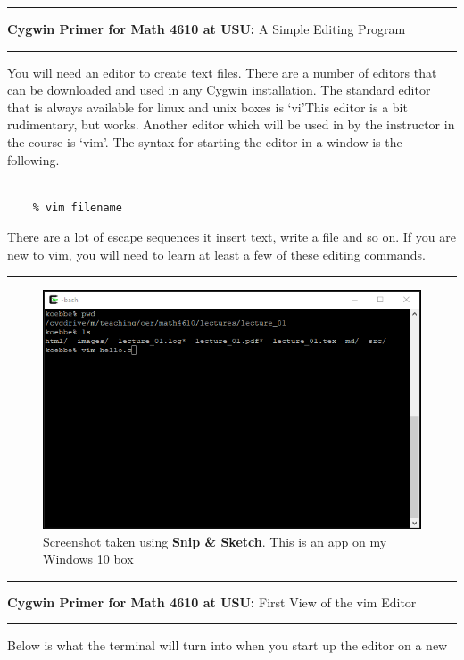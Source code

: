 \documentclass[10pt,fleqn]{article}
\begin{document}
\eject
\vskip0.1in\hrule\vskip0.1in
\noindent
{{\bf Cygwin Primer for Math 4610 at USU:} A Simple Editing Program} 
\vskip0.1in\hrule\vskip0.1in
\noindent
You will need an editor to create text files. There are a number of editors that
can be downloaded and used in any Cygwin installation. The standard editor that
is always available for linux and unix boxes is \lq vi\rq\. This editor is a bit
rudimentary, but works. Another editor which will be used in by the instructor
in the course is \lq vim\rq. The syntax for starting the editor in a window is
the following.
\begin{verbatim}

    % vim filename

\end{verbatim}
There are a lot of escape sequences it insert text, write a file and so on. If
you are new to vim, you will need to learn at least a few of these editing
commands.
\vskip0.1in\hrule\vskip0.1in
\vfill
\begin{figure}[h]
\centering
\includegraphics{./images/cygwin_05.png}
\caption{{Screenshot} taken using {\bf Snip \& Sketch}. This is an app on
         my Windows 10 box}
\end{figure}
\eject
\vskip0.1in\hrule\vskip0.1in
\noindent
{{\bf Cygwin Primer for Math 4610 at USU:} First View of the vim Editor} 
\vskip0.1in\hrule\vskip0.1in
\noindent
Below is what the terminal will turn into when you start up the editor on a new
\end{document}
